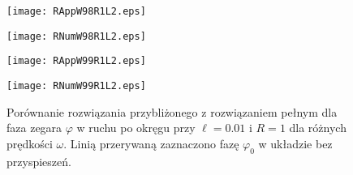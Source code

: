\begin{figure}[h]
\begin{minipage}[b]{.5\linewidth}
\centering
\texttt{[image: RAppW98R1L2.eps]}
\label{fig:3a1}
\end{minipage}%
\begin{minipage}[b]{.5\linewidth}
\centering
\texttt{[image: RNumW98R1L2.eps]}
\label{fig:3n1}
\end{minipage}
\begin{minipage}[b]{.5\linewidth}
\centering
\texttt{[image: RAppW99R1L2.eps]}
\label{fig:3a2}
\end{minipage}%
\begin{minipage}[b]{.5\linewidth}
\centering
\texttt{[image: RNumW99R1L2.eps]}
\label{fig:3n2}
\end{minipage}
\caption{Porównanie rozwiązania przybliżonego z rozwiązaniem pełnym
dla faza zegara $\varphi$ w ruchu po okręgu przy
$\ell=0.01$ i $R=1$ dla różnych prędkości $\omega$. 
Linią przerywaną zaznaczono fazę 
$\varphi_0$ w układzie bez przyspieszeń.}\label{fig:3}
\end{figure}
\newpage
